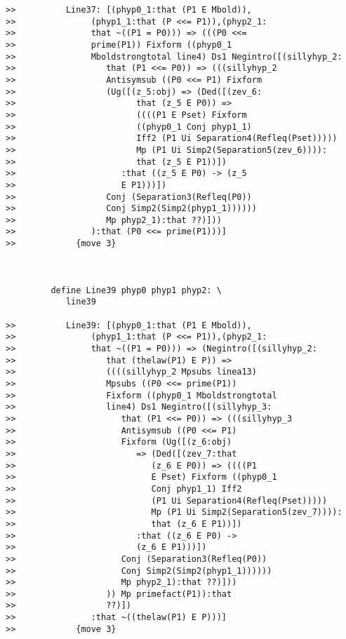 \documentclass[12pt]{article}
\begin{document}
\begin{verbatim}
>>          Line37: [(phyp0_1:that (P1 E Mbold)),
>>               (phyp1_1:that (P <<= P1)),(phyp2_1:
>>               that ~((P1 = P0))) => (((P0 <<=
>>               prime(P1)) Fixform ((phyp0_1
>>               Mboldstrongtotal line4) Ds1 Negintro([(sillyhyp_2:
>>                  that (P1 <<= P0)) => (((sillyhyp_2
>>                  Antisymsub ((P0 <<= P1) Fixform
>>                  (Ug([(z_5:obj) => (Ded([(zev_6:
>>                        that (z_5 E P0)) =>
>>                        ((((P1 E Pset) Fixform
>>                        ((phyp0_1 Conj phyp1_1)
>>                        Iff2 (P1 Ui Separation4(Refleq(Pset)))))
>>                        Mp (P1 Ui Simp2(Separation5(zev_6)))):
>>                        that (z_5 E P1))])
>>                     :that ((z_5 E P0) -> (z_5
>>                     E P1)))])
>>                  Conj (Separation3(Refleq(P0))
>>                  Conj Simp2(Simp2(phyp1_1))))))
>>                  Mp phyp2_1):that ??)]))
>>               ):that (P0 <<= prime(P1)))]
>>            {move 3}



         define Line39 phyp0 phyp1 phyp2: \
            line39

>>          Line39: [(phyp0_1:that (P1 E Mbold)),
>>               (phyp1_1:that (P <<= P1)),(phyp2_1:
>>               that ~((P1 = P0))) => (Negintro([(sillyhyp_2:
>>                  that (thelaw(P1) E P)) =>
>>                  ((((sillyhyp_2 Mpsubs linea13)
>>                  Mpsubs ((P0 <<= prime(P1))
>>                  Fixform ((phyp0_1 Mboldstrongtotal
>>                  line4) Ds1 Negintro([(sillyhyp_3:
>>                     that (P1 <<= P0)) => (((sillyhyp_3
>>                     Antisymsub ((P0 <<= P1)
>>                     Fixform (Ug([(z_6:obj)
>>                        => (Ded([(zev_7:that
>>                           (z_6 E P0)) => ((((P1
>>                           E Pset) Fixform ((phyp0_1
>>                           Conj phyp1_1) Iff2
>>                           (P1 Ui Separation4(Refleq(Pset)))))
>>                           Mp (P1 Ui Simp2(Separation5(zev_7)))):
>>                           that (z_6 E P1))])
>>                        :that ((z_6 E P0) ->
>>                        (z_6 E P1)))])
>>                     Conj (Separation3(Refleq(P0))
>>                     Conj Simp2(Simp2(phyp1_1))))))
>>                     Mp phyp2_1):that ??)]))
>>                  )) Mp primefact(P1)):that
>>                  ??)])
>>               :that ~((thelaw(P1) E P)))]
>>            {move 3}




\end{verbatim}
\end{document}
